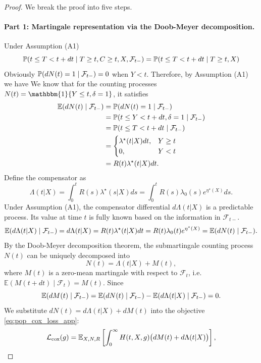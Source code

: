 \documentclass[11pt]{article}
\theoremstyle{plain}
\theoremstyle{plain}
\theoremstyle{plain}
\theoremstyle{plain}
\theoremstyle{plain}
\theoremstyle{plain}
\theoremstyle{plain}
\begin{document}
\begin{proof}
We break the proof into five steps.

\paragraph{Part 1: Martingale representation via the Doob-Meyer decomposition.} 
Under Assumption (A1)
$$\mathbb{P}(t \leq T < t + dt \mid T \geq t, C \geq t, X, \mathcal{F}_{t-})  =  \mathbb{P}(t \leq T < t + dt \mid T \geq t, X) $$
Obviously $\mathbb{P}(dN(t) = 1 \mid \mathcal{F}_{t-}) = 0$ when $Y < t$. Therefore, by Assumption (A1) we have 
We know that for the counting processes
$N(t) = \mathbbm{1}\{Y\leq t, \delta =1 \}$, it satisfies 
\begin{equation*}
\begin{aligned}
\mathbb{E}(dN(t) \mid \mathcal{F}_{t-}) &= \mathbb{P}(dN(t) = 1 \mid \mathcal{F}_{t-}) \\
  &= \mathbb{P}(t \leq Y < t + dt, \delta = 1 \mid \mathcal{F}_{t-}) \\
  &= \mathbb{P}(t \leq T < t + dt \mid \mathcal{F}_{t-})\\
  & = \begin{cases}
    \lambda^\star(t|X)dt, & Y \geq t \\
    0,  & Y < t 
  \end{cases}\\ 
  &= R(t)\lambda^\star(t|X)dt.
\end{aligned}    
\end{equation*}
Define the compensator as $$\Lambda(t|X) = \int_0^t R(s) \lambda^\star(s|X) ds = \int_0^t R(s) \lambda_{0}(s)e^{\eta^{\star}(X)} ds.$$
Under Assumption (A1), the compensator differential $d\Lambda(t|X)$ is a predictable process. Its value at time $t$ is fully known based on the information in $\mathcal{F}_{t-}$. 
$$\mathbb{E}(d\Lambda(t|X)\mid \mathcal{F}_{t-}) = d\Lambda(t|X) =  R(t)\lambda^\star(t|X)dt = R(t) \lambda_0(t) e^{\eta^{\star}(X)} = \mathbb{E}(dN(t) \mid \mathcal{F}_{t-}).$$  
By the Doob-Meyer decomposition theorem, the submartingale counting process $N(t)$ can be uniquely decomposed into $$N(t) = \Lambda(t|X) + M(t), $$ where $M(t)$ is a zero-mean martingale with respect to $\mathcal{F}_t$, i.e. $\mathbb{E}(M(t+dt) \mid \mathcal{F}_t) = M(t)$.  Since 
$$\mathbb{E}(dM(t) \mid \mathcal{F}_{t-}) = \mathbb{E}(dN(t) \mid \mathcal{F}_{t-}) - \mathbb{E}(d\Lambda(t|X)\mid \mathcal{F}_{t-}) =  0.$$ 
We substitute $dN(t) = d\Lambda(t|X) + dM(t)$ into the objective \eqref{eq:pop_cox_loss_app}:
\begin{equation}
    \mathcal{L}_{\textup{cox}}(g) = \mathbb{E}_{X, N, R} \left[ \int_0^\infty H(t, X, g) \big( dM(t) + d\Lambda(t|X) \big) \right],

\end{equation}
\end{proof}
\end{document}
